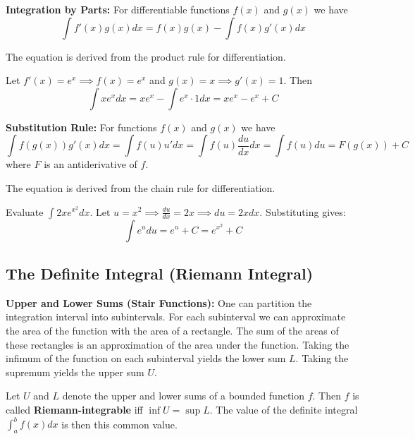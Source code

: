 \begin{theorem}
    \textbf{Integration by Parts:} For differentiable functions $f(x)$ and $g(x)$ we have
    $$\int f'(x)g(x)dx = f(x)g(x) - \int f(x)g'(x)dx $$
\end{theorem}

\begin{remark}
    The equation is derived from the product rule for differentiation. 
\end{remark}

\begin{example}
    Let $f'(x) = e^x \implies f(x) = e^x$ and $g(x) = x \implies g'(x) = 1$. Then 
    $$\int x e^x dx = x e^x - \int e^x \cdot 1 dx = x e^x - e^x + C$$
\end{example}

\begin{theorem}
    \textbf{Substitution Rule:} For functions $f(x)$ and $g(x)$ we have
    $$\int f(g(x))g'(x)dx  = \int f(u) u' dx = \int f(u) \frac{du}{dx} dx = \int f(u) du = F(g(x)) + C $$
    where $F$ is an antiderivative of $f$.
\end{theorem}

\begin{remark}
    The equation is derived from the chain rule for differentiation. 
\end{remark}

\begin{example}
    Evaluate $\int 2x e^{x^2} dx$. 
    Let $u = x^2 \implies \frac{du}{dx} = 2x \implies du = 2x dx$.
    Substituting gives:
    $$\int e^u du = e^u + C = e^{x^2} + C$$
\end{example}

\subsection{The Definite Integral (Riemann Integral)}

\begin{remark}
    \textbf{Upper and Lower Sums (Stair Functions):} One can partition the integration interval into subintervals. For each subinterval we can approximate the area of the function with the area of a rectangle. The sum of the areas of these rectangles is an approximation of the area under the function. Taking the infimum of the function on each subinterval yields the lower sum $L$. Taking the supremum yields the upper sum $U$.
\end{remark}

\begin{definition}
    Let $U$ and $L$ denote the upper and lower sums of a bounded function $f$. Then $f$ is called \textbf{Riemann-integrable} iff $\inf U = \sup L$. The value of the definite integral $\int_a^b f(x)dx$ is then this common value.
\end{definition}

